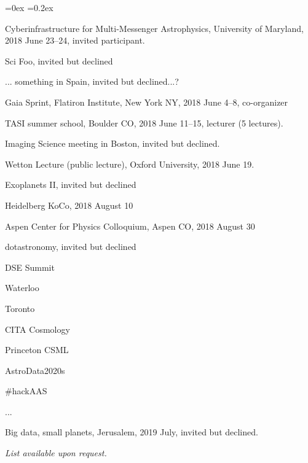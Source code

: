 \documentclass[12pt,letterpaper]{article}
\newcounter{refpubnum}
\newcommand{\hogglist}{%
    \rightmargin=0in
    \leftmargin=0.18in
    \topsep=0ex
    \partopsep=0pt
    \itemsep=0.2ex
    \parsep=0pt
    \itemindent=-1.0\leftmargin
    \listparindent=0.0\leftmargin
    \settowidth{\labelsep}{~}
    \usecounter{refpubnum}
  }
\begin{document}
\begin{list}{}{\hogglist}
{\item Cyberinfrastructure for Multi-Messenger Astrophysics, University of Maryland, 2018 June 23--24, invited participant.
\item Sci Foo, invited but declined
\item ... something in Spain, invited but declined...?
\item Gaia Sprint, Flatiron Institute, New York NY, 2018 June 4--8, co-organizer
\item TASI summer school, Boulder CO, 2018 June 11--15, lecturer (5 lectures).
\item Imaging Science meeting in Boston, invited but declined.
\item Wetton Lecture (public lecture), Oxford University, 2018 June 19.
\item Exoplanets II, invited but declined
\item Heidelberg KoCo, 2018 August 10
\item Aspen Center for Physics Colloquium, Aspen CO, 2018 August 30
\item dotastronomy, invited but declined
\item DSE Summit
\item Waterloo
\item Toronto
\item CITA Cosmology
\item Princeton CSML
\item AstroData2020s
\item #hackAAS
\item ...
\item Big data, small planets, Jerusalem, 2019 July, invited but declined.
}{%
\item \textit{List available upon request.}
}%
\end{list}
\end{document}
